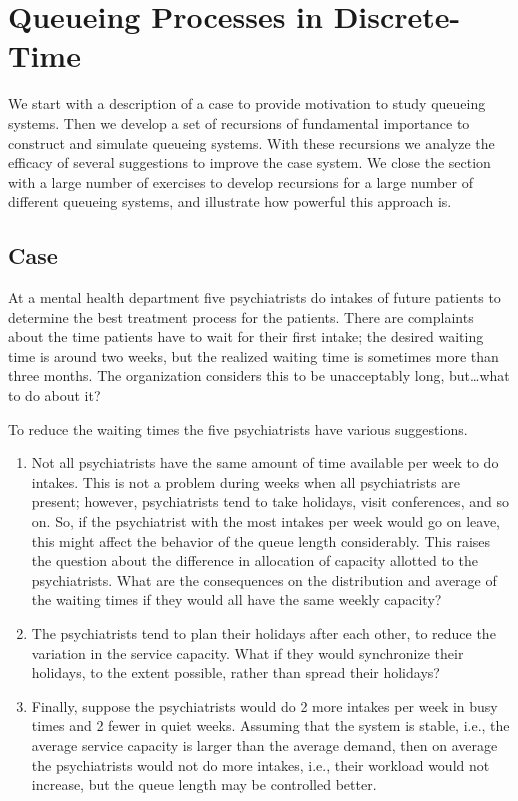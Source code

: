 \section{Queueing Processes in Discrete-Time}
\label{sec:constr-discr-time}



We start with a description of a case to provide motivation to study queueing systems.
Then we develop a set of recursions of fundamental importance to construct and simulate queueing systems.
With these recursions we analyze the efficacy of several suggestions to improve the case system.
We close the section with a large number of exercises to develop recursions for a large number of different queueing systems, and illustrate how powerful this approach is.

\subsection*{Case}
\label{sec:case}

At a mental health department five psychiatrists do intakes of future patients to determine the best treatment process for the patients.
There are complaints about the time patients have to wait for their first intake; the desired waiting time is around two weeks, but the realized waiting time is sometimes more than three months.
The organization considers this to be unacceptably long, but\ldots what to do about it?

To reduce the waiting times the five psychiatrists have various
suggestions. 
\begin{enumerate}
\item Not all psychiatrists have the same amount of time available per week to do intakes.
  This is not a problem during weeks when all psychiatrists are present; however, psychiatrists tend to take holidays, visit conferences, and so on.
  So, if the psychiatrist with the most intakes per week would go on leave, this might affect the behavior of the queue length considerably.
  This raises the question about the difference in allocation of capacity allotted to the psychiatrists.
  What are the consequences on the distribution and average of the waiting times if they would all have the same weekly capacity?
\item The psychiatrists tend to plan their holidays after each other, to reduce the variation in the service capacity.
  What if they would synchronize their holidays, to the extent possible, rather than spread their holidays?
\item Finally, suppose the psychiatrists would do 2 more intakes per week in busy times and 2 fewer in quiet weeks.
  Assuming that the system is stable, i.e., the average service capacity is larger than the average demand, then on average the psychiatrists would not do more intakes, i.e., their workload would not increase, but the queue length may be controlled better.
\end{enumerate}

